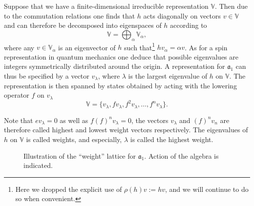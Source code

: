 Suppose that we have a finite-dimensional irreducible representation $\mathbb{V}$. Then due to the commutation relations one finds that $h$ acts diagonally on vectors $v\in \mathbb{V}$ and can therefore be decomposed into eigenspaces of $h$ according to
\begin{equation}
    \mathbb{V} = \bigoplus_\alpha \mathbb{V}_\alpha,
\end{equation}
where any $v\in\mathbb{V}_\alpha$ is an eigenvector of $h$ such that\footnote{Here we dropped the explicit use of $\rho(h)v :=hv$, and we will continue to do so when convenient.} $hv_\alpha = \alpha v$. As for a spin representation in quantum mechanics one deduce that possible eigenvalues are integers symmetrically distributed around the origin. A representation for $\mathfrak{a}_1$ can thus be specified by a vector $v_\lambda$, where $\lambda$ is the largest eigenvalue of $h$ on $\mathbb{V}$. The representation is then spanned by states obtained by acting with the lowering operator $f$ on $v_\lambda$ 
\begin{equation}
    \mathbb{V} = \{v_\lambda,fv_\lambda,f^2v_\lambda,\ldots,f^{n}v_\lambda\}.
\end{equation}

Note that $ev_\lambda = 0$ as well as $f(f)^{n}v_\lambda=0$, the vectors $v_\lambda$ and $(f)^{n}v_n$ are therefore called highest and lowest weight vectors respectively. The eigenvalues of $h$ on $\mathbb{V}$ is called weights, and especially, $\lambda$ is called the highest weight. 

\begin{figure}
    \centering
    \caption{Illustration of the ``weight'' lattice for $\mathfrak{a}_1$. Action of the algebra is indicated. }
    \label{fig:SlTwoRep}
\end{figure}



